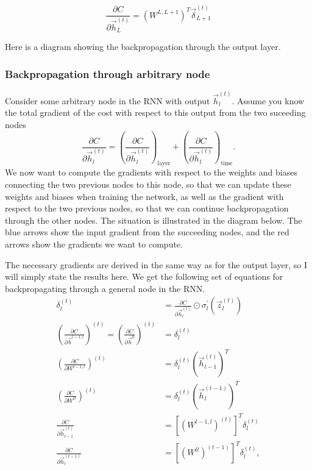 \documentclass[11pt]{article}
\begin{document}
\[\frac{\partial C}{\partial \vec{h}_L^{(t)}} = \left( W^{L,L+1} \right)^T \vec{\delta}_{L+1}^{(t)}\]

    Here is a diagram showing the backpropagation through the output layer.

    

    \subsubsection{Backpropagation through arbitrary
node}\label{backpropagation-through-arbitrary-node}

    Consider some arbitrary node in the RNN with output \(\vec{h}_l^{(t)}\).
Assume you know the total gradient of the cost with respect to this
output from the two suceeding nodes \[
\frac{\partial C}{\partial \vec{h}_l^{(t)}} = \left( \frac{\partial C}{\partial \vec{h}_l^{(t)}} \right)_\text{layer} + \left( \frac{\partial C}{\partial \vec{h}_l^{(t)}} \right)_\text{time}.
\] We now want to compute the gradients with respect to the weights and
biases connecting the two previous nodes to this node, so that we can
update these weights and biases when training the network, as well as
the gradient with respect to the two previous nodes, so that we can
continue backpropagation through the other nodes. The situation is
illustrated in the diagram below. The blue arrows show the input
gradient from the succeeding nodes, and the red arrows show the
gradients we want to compute.

    

    The necessary gradients are derived in the same way as for the output
layer, so I will simply state the results here. We get the following set
of equations for backpropagating through a general node in the RNN.
\begin{align}
\delta_l^{(t)} &= \frac{\partial C}{\partial \vec{h}_l^{(t)}} \odot \sigma_l^\prime \left(\vec{z}_l^{(t)} \right)
\\[4ex]
\left( \frac{\partial C}{\partial \vec{b}^{l-1,l}} \right)^{(t)} = \left( \frac{\partial C}{\partial \vec{b}^{ll}} \right)^{(t)} &= \delta_l^{(t)}
\\[4ex]
\left( \frac{\partial C}{\partial W^{l-1,l}} \right)^{(t)} &= \delta_l^{(t)} \left( \vec{h}_{l-1}^{(t)} \right)^T
\\[4ex]
\left( \frac{\partial C}{\partial W^{ll}} \right)^{(t)} &= \delta_l^{(t)} \left( \vec{h}_l^{(t-1)} \right)^T
\\[4ex]
\frac{\partial C}{\partial \vec{h}_{l-1}^{(t)}} &= \left[ \left( W^{l-1,l} \right)^{(t)} \right]^T \delta_l^{(t)}
\\[4ex]
\frac{\partial C}{\partial \vec{h}_{l}^{(t-1)}} &= \left[ \left( W^{ll} \right)^{(t-1)} \right]^T \delta_l^{(t)},
\end{align}
\end{document}
